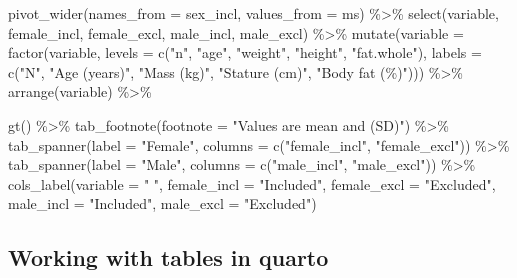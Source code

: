 \documentclass[
  11pt,
  letterpaper,
]{scrbook}
\newenvironment{Shaded}{\begin{snugshade}}{\end{snugshade}}
\newcommand{\AttributeTok}[1]{\textcolor[rgb]{0.40,0.45,0.13}{#1}}
\newcommand{\FunctionTok}[1]{\textcolor[rgb]{0.28,0.35,0.67}{#1}}
\newcommand{\NormalTok}[1]{\textcolor[rgb]{0.00,0.23,0.31}{#1}}
\newcommand{\SpecialCharTok}[1]{\textcolor[rgb]{0.37,0.37,0.37}{#1}}
\newcommand{\StringTok}[1]{\textcolor[rgb]{0.13,0.47,0.30}{#1}}
\begin{document}
\begin{Shaded}
\begin{Highlighting}[numbers=left,,]
  \FunctionTok{pivot\_wider}\NormalTok{(}\AttributeTok{names\_from =}\NormalTok{ sex\_incl, }
              \AttributeTok{values\_from =}\NormalTok{ ms) }\SpecialCharTok{\%\textgreater{}\%}
  \FunctionTok{select}\NormalTok{(variable, female\_incl, female\_excl, male\_incl, male\_excl) }\SpecialCharTok{\%\textgreater{}\%}
  \FunctionTok{mutate}\NormalTok{(}\AttributeTok{variable =} \FunctionTok{factor}\NormalTok{(variable, }\AttributeTok{levels =} \FunctionTok{c}\NormalTok{(}\StringTok{"n"}\NormalTok{, }\StringTok{"age"}\NormalTok{, }\StringTok{"weight"}\NormalTok{, }\StringTok{"height"}\NormalTok{, }\StringTok{"fat.whole"}\NormalTok{), }
                           \AttributeTok{labels =} \FunctionTok{c}\NormalTok{(}\StringTok{"N"}\NormalTok{, }\StringTok{"Age (years)"}\NormalTok{, }\StringTok{"Mass (kg)"}\NormalTok{, }
                                      \StringTok{"Stature (cm)"}\NormalTok{, }\StringTok{"Body fat (\%)"}\NormalTok{))) }\SpecialCharTok{\%\textgreater{}\%}
  \FunctionTok{arrange}\NormalTok{(variable) }\SpecialCharTok{\%\textgreater{}\%}
  
  \FunctionTok{gt}\NormalTok{() }\SpecialCharTok{\%\textgreater{}\%}
  \FunctionTok{tab\_footnote}\NormalTok{(}\AttributeTok{footnote =} \StringTok{"Values are mean and (SD)"}\NormalTok{) }\SpecialCharTok{\%\textgreater{}\%}
  \FunctionTok{tab\_spanner}\NormalTok{(}\AttributeTok{label =} \StringTok{"Female"}\NormalTok{, }\AttributeTok{columns =} \FunctionTok{c}\NormalTok{(}\StringTok{"female\_incl"}\NormalTok{, }\StringTok{"female\_excl"}\NormalTok{)) }\SpecialCharTok{\%\textgreater{}\%}
  \FunctionTok{tab\_spanner}\NormalTok{(}\AttributeTok{label =} \StringTok{"Male"}\NormalTok{, }\AttributeTok{columns =} \FunctionTok{c}\NormalTok{(}\StringTok{"male\_incl"}\NormalTok{, }\StringTok{"male\_excl"}\NormalTok{)) }\SpecialCharTok{\%\textgreater{}\%}
  \FunctionTok{cols\_label}\NormalTok{(}\AttributeTok{variable =} \StringTok{" "}\NormalTok{, }
             \AttributeTok{female\_incl =} \StringTok{"Included"}\NormalTok{, }
             \AttributeTok{female\_excl =} \StringTok{"Excluded"}\NormalTok{, }
             \AttributeTok{male\_incl =} \StringTok{"Included"}\NormalTok{, }
             \AttributeTok{male\_excl =} \StringTok{"Excluded"}\NormalTok{)}
\end{Highlighting}
\end{Shaded}

\hypertarget{working-with-tables-in-quarto}{%
\subsection{Working with tables in
quarto}\label{working-with-tables-in-quarto}}
\end{document}
